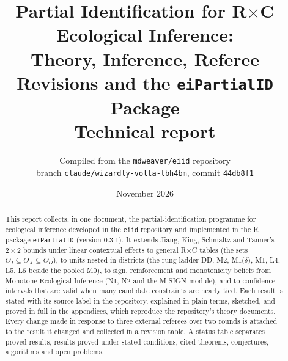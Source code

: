 \documentclass[11pt]{article}
\title{Partial Identification for R$\times$C Ecological Inference:\\
Theory, Inference, Referee Revisions and the \texttt{eiPartialID} Package\\[4pt]
\large Technical report}
\author{Compiled from the \texttt{mdweaver/eiid} repository\\
\small branch \texttt{claude/wizardly-volta-lbh4bm}, commit \texttt{44db8f1}}
\date{November 2026}
\begin{document}
\maketitle

\begin{abstract}
\noindent This report collects, in one document, the partial-identification
programme for ecological inference developed in the \texttt{eiid} repository and
implemented in the R package \texttt{eiPartialID} (version 0.3.1). It extends
Jiang, King, Schmaltz and Tanner's $2\times2$ bounds under linear contextual
effects to general R$\times$C tables (the sets $\Theta_I\subseteq\Theta_X\subseteq\Theta_O$),
to units nested in districts (the rung ladder DD, M2, M1($\delta$), M1, L4, L5,
L6 beside the pooled M0), to sign, reinforcement and monotonicity beliefs from
Monotone Ecological Inference (N1, N2 and the M-SIGN module), and to confidence
intervals that are valid when many candidate constraints are nearly tied. Each
result is stated with its source label in the repository, explained in plain
terms, sketched, and proved in full in the appendices, which reproduce the
repository's theory documents. Every change made in response to three external
referees over two rounds is attached to the result it changed and collected in a
revision table. A status table separates proved results, results proved under
stated conditions, cited theorems, conjectures, algorithms and open problems.
\end{abstract}

\tableofcontents
\clearpage


















\clearpage
\appendix
\ifrevisions\fi

\end{document}
